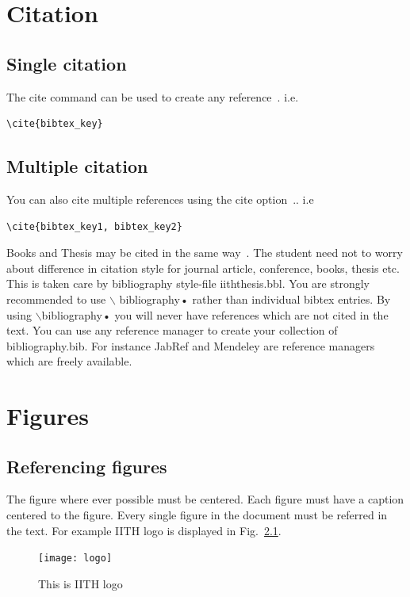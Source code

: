 \documentclass[a4paper,twoside]{iiththesis}
\begin{document}
\chapter{Citation}
\section{Single citation}
The cite command can be used to create any reference~\cite{Achenbach1995}. i.e. 
\begin{verbatim}
\cite{bibtex_key}
\end{verbatim}


\section{Multiple citation}
You can also cite multiple references using the cite option~\cite{Achenbach1995,Aguiar2004}.. i.e
\begin{verbatim}
\cite{bibtex_key1, bibtex_key2}
\end{verbatim}

Books and Thesis may be cited in the same way~\cite{Bard2001,Iordanidis2002}. The student need not to worry about difference in citation style for journal article, conference, books, thesis etc. This is taken care by bibliography style-file iiththesis.bbl. You are strongly recommended to use $ \backslash $ bibliography{•} rather than individual bibtex entries. By using $ \backslash $bibliography{•} you will never have references which are not cited in the text. You can use any reference manager to create your collection of bibliography.bib. For instance JabRef and Mendeley are reference managers which are freely available.

\chapter{Figures}
\section{Referencing figures}
The figure where ever possible must be centered. Each figure must have a caption centered to the figure. Every single figure in the document must be referred in the text. For example IITH logo is displayed in Fig.~\ref{iithlogo}.

\begin{figure}[h]
\centering
\texttt{[image: logo]}
\caption{This is IITH logo}
\label{iithlogo}
\end{figure}
\end{document}
